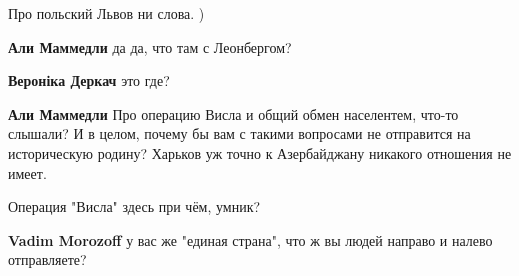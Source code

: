 \begin{itemize}
 
Про польский Львов ни слова. )

\begin{itemize}
 
\textbf{Али Маммедли} да да, что там с Леонбергом?

 
\textbf{Вероніка Деркач} это где?

 
\textbf{Али Маммедли} Про операцию Висла и общий обмен населентем, что-то слышали? И в целом, почему бы вам с такими вопросами не отправится на историческую родину? Харьков уж точно к Азербайджану никакого отношения не имеет.

 
Операция "Висла" здесь при чём, умник?

 
\textbf{Vadim Morozoff} у вас же "единая страна", что ж вы людей направо и налево отправляете?

 

\end{itemize}
\end{itemize}
